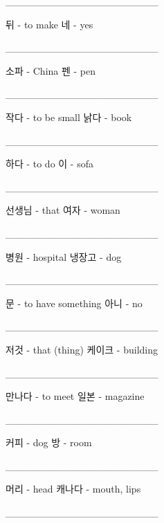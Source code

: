 \documentclass[addpoints, 30pt]{../exam}%
\begin{document}
\begin{questions}
\question[1]%
\_\_\_\_\_\_\_\_\_\_\_\_\_\_\_\_\_\_\_\_\_%
\begin{choices}%
\choice%
뒤 {-} to make%
\CorrectChoice%
네 {-} yes%
\end{choices}%
\question[1]%
\_\_\_\_\_\_\_\_\_\_\_\_\_\_\_\_\_\_\_\_\_%
\begin{choices}%
\choice%
소파 {-} China%
\CorrectChoice%
펜 {-} pen%
\end{choices}%
\question[1]%
\_\_\_\_\_\_\_\_\_\_\_\_\_\_\_\_\_\_\_\_\_%
\begin{choices}%
\CorrectChoice%
작다 {-} to be small%
\choice%
낡다 {-} book%
\end{choices}%
\question[1]%
\_\_\_\_\_\_\_\_\_\_\_\_\_\_\_\_\_\_\_\_\_%
\begin{choices}%
\CorrectChoice%
하다 {-} to do%
\choice%
이 {-} sofa%
\end{choices}%
\question[1]%
\_\_\_\_\_\_\_\_\_\_\_\_\_\_\_\_\_\_\_\_\_%
\begin{choices}%
\choice%
선생님 {-} that%
\CorrectChoice%
여자 {-} woman%
\end{choices}%
\question[1]%
\_\_\_\_\_\_\_\_\_\_\_\_\_\_\_\_\_\_\_\_\_%
\begin{choices}%
\CorrectChoice%
병원 {-} hospital%
\choice%
냉장고 {-} dog%
\end{choices}%
\question[1]%
\_\_\_\_\_\_\_\_\_\_\_\_\_\_\_\_\_\_\_\_\_%
\begin{choices}%
\choice%
문 {-} to have something%
\CorrectChoice%
아니 {-} no%
\end{choices}%
\question[1]%
\_\_\_\_\_\_\_\_\_\_\_\_\_\_\_\_\_\_\_\_\_%
\begin{choices}%
\CorrectChoice%
저것 {-} that (thing)%
\choice%
케이크 {-} building%
\end{choices}%
\question[1]%
\_\_\_\_\_\_\_\_\_\_\_\_\_\_\_\_\_\_\_\_\_%
\begin{choices}%
\CorrectChoice%
만나다 {-} to meet%
\choice%
일본 {-} magazine%
\end{choices}%
\question[1]%
\_\_\_\_\_\_\_\_\_\_\_\_\_\_\_\_\_\_\_\_\_%
\begin{choices}%
\choice%
커피 {-} dog%
\CorrectChoice%
방 {-} room%
\end{choices}%
\question[1]%
\_\_\_\_\_\_\_\_\_\_\_\_\_\_\_\_\_\_\_\_\_%
\begin{choices}%
\CorrectChoice%
머리 {-} head%
\choice%
캐나다 {-} mouth, lips%
\end{choices}%
\question[1]%
\_\_\_\_\_\_\_\_\_\_\_\_\_\_\_\_\_\_\_\_\_%
\begin{choices}%

\end{choices}
\end{questions}
\end{document}
